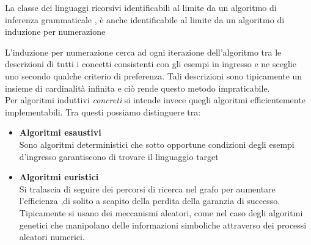 \begin{description}
\begin{teorema*}La classe dei linguaggi ricorsivi identificabili al limite da un algoritmo di inferenza grammaticale , è anche identificabile al limite da un algoritmo di induzione per numerazione
\end{teorema*} 
 L'induzione per numerazione cerca ad ogni iterazione dell'algoritmo tra le descrizioni di tutti i concetti consistenti con gli esempi in ingresso e ne sceglie uno secondo qualche criterio di preferenza. Tali descrizioni sono tipicamente un insieme di cardinalità infinita e ciò rende questo metodo impraticabile.\\
 Per algoritmi induttivi \textit{concreti} si intende invece quegli algoritmi efficientemente implementabili. Tra questi possiamo distinguere tra:
 \begin{itemize}
 \item \textbf{Algoritmi esaustivi}\\
 Sono algoritmi deterministici che sotto opportune condizioni degli esempi d'ingresso garantiscono di trovare il linguaggio target
 \item \textbf{Algoritmi euristici}\\
 Si tralascia di seguire dei percorsi di ricerca nel grafo per aumentare l'efficienza ,di solito a scapito della perdita della garanzia di successo. Tipicamente si usano dei meccanismi aleatori, come nel caso degli algoritmi genetici che manipolano delle informazioni simboliche attraverso dei processi aleatori numerici.
 \end{itemize}  
\end{description}

